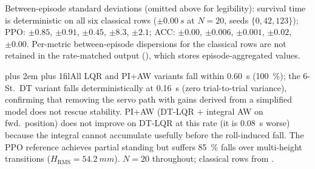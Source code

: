 \documentclass[conference]{IEEEtran}
\newcommand{\tabnote}{\par\leftskip=0pt\rightskip=0pt plus 2em%
  \parfillskip=0pt plus 1fil\relax}
\begin{document}
\begin{table}[t]
Between-episode standard deviations (omitted above for legibility): survival time is
deterministic on all six classical rows ($\pm\SI{0.00}{s}$ at $N{=}20$, seeds $\{0,42,123\}$);
PPO: $\pm0.85$, $\pm0.91$, $\pm0.45$, $\pm8.3$, $\pm2.1$;
ACC: $\pm0.00$, $\pm0.006$, $\pm0.001$, $\pm0.02$, $\pm0.00$.
Per-metric between-episode dispersions for the classical rows are not retained in the
rate-matched output (), which stores
episode-aggregated values.
\vspace{2pt}\tabnote\noindent All LQR and PI+AW variants fall within \SI{0.60}{s} (\SI{100}{\percent}); the 6-St.\ DT variant falls deterministically at \SI{0.16}{s} (zero trial-to-trial variance), confirming that removing the servo path with gains derived from a simplified model does not rescue stability. PI+AW (DT-LQR $+$ integral AW on fwd.\ position) does not improve on DT-LQR at this rate (it is \SI{0.08}{s} worse) because the integral cannot accumulate usefully before the roll-induced fall. The PPO reference achieves partial standing but suffers \SI{85}{\percent} falls over multi-height transitions ($H_{\text{RMS}}{=}\SI{54.2}{mm}$). $N{=}20$ throughout; classical rows from .
\end{table}
\end{document}
